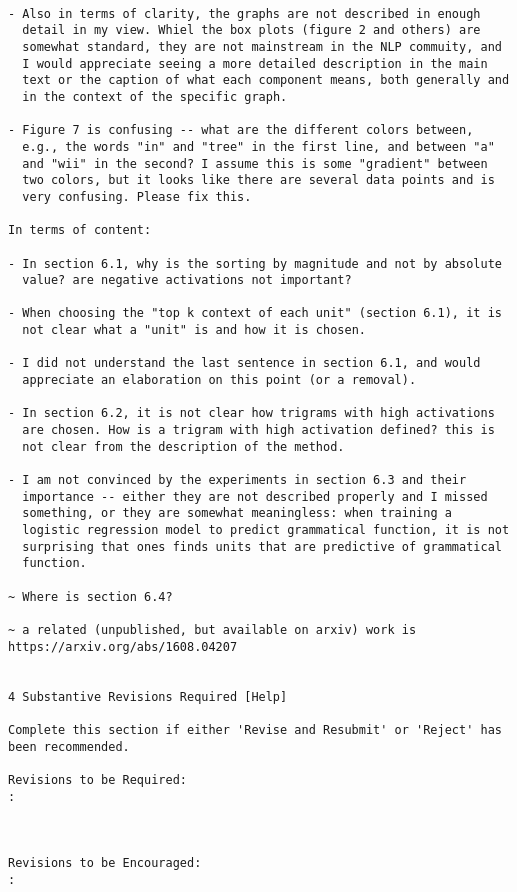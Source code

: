 \begin{verbatim}

- Also in terms of clarity, the graphs are not described in enough
  detail in my view. Whiel the box plots (figure 2 and others) are
  somewhat standard, they are not mainstream in the NLP commuity, and
  I would appreciate seeing a more detailed description in the main
  text or the caption of what each component means, both generally and
  in the context of the specific graph.

- Figure 7 is confusing -- what are the different colors between,
  e.g., the words "in" and "tree" in the first line, and between "a"
  and "wii" in the second? I assume this is some "gradient" between
  two colors, but it looks like there are several data points and is
  very confusing. Please fix this.

In terms of content:

- In section 6.1, why is the sorting by magnitude and not by absolute
  value? are negative activations not important?

- When choosing the "top k context of each unit" (section 6.1), it is
  not clear what a "unit" is and how it is chosen.

- I did not understand the last sentence in section 6.1, and would
  appreciate an elaboration on this point (or a removal).

- In section 6.2, it is not clear how trigrams with high activations
  are chosen. How is a trigram with high activation defined? this is
  not clear from the description of the method.

- I am not convinced by the experiments in section 6.3 and their
  importance -- either they are not described properly and I missed
  something, or they are somewhat meaningless: when training a
  logistic regression model to predict grammatical function, it is not
  surprising that ones finds units that are predictive of grammatical
  function.

~ Where is section 6.4?

~ a related (unpublished, but available on arxiv) work is
https://arxiv.org/abs/1608.04207


4 Substantive Revisions Required [Help]

Complete this section if either 'Revise and Resubmit' or 'Reject' has
been recommended.

Revisions to be Required:
: 



Revisions to be Encouraged:
: 




\end{verbatim}
